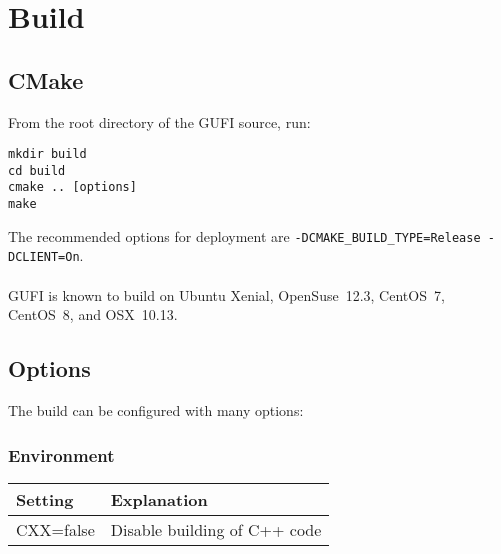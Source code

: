 \section{Build}

\subsection{CMake}
From the root directory of the GUFI source, run:
\begin{verbatim}
mkdir build
cd build
cmake .. [options]
make
\end{verbatim}

The recommended options for deployment are
\texttt{-DCMAKE\_BUILD\_TYPE=Release -DCLIENT=On}.
\\\\
GUFI is known to build on Ubuntu Xenial, OpenSuse~12.3, CentOS~7,
CentOS~8, and OSX~10.13.

\subsection{Options}
The build can be configured with many options:

\subsubsection{Environment}
\begin{tabular} {| l | l |}
  \hline
  Setting & Explanation \\
  \hline
  CXX=false & Disable building of C++ code \\
  \hline
\end{tabular}

